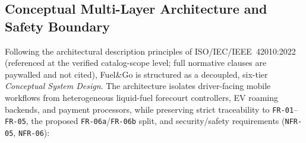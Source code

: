 

\subsection{Conceptual Multi-Layer Architecture and Safety Boundary}
\label{sec:arch-layers}

Following the architectural description principles of ISO/IEC/IEEE~42010:2022~\cite{iso42010_2022} (referenced at the verified catalog-scope level; full normative clauses are paywalled and not cited), Fuel\&Go is structured as a decoupled, six-tier \emph{Conceptual System Design}. The architecture isolates driver-facing mobile workflows from heterogeneous liquid-fuel forecourt controllers, EV roaming backends, and payment processors, while preserving strict traceability to \texttt{FR-01}--\texttt{FR-05}, the proposed \texttt{FR-06a}/\texttt{FR-06b} split, and security/safety requirements (\texttt{NFR-05}, \texttt{NFR-06}):

